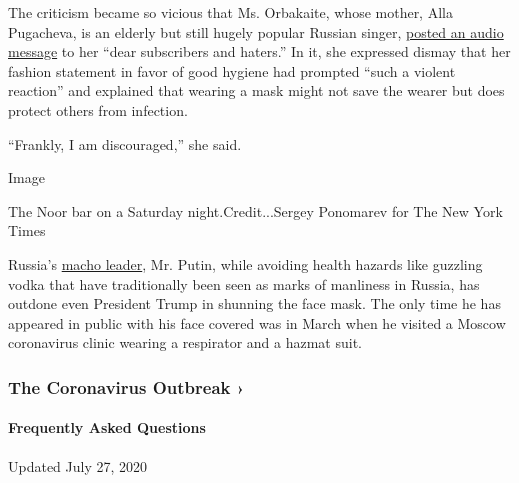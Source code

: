 The criticism became so vicious that Ms. Orbakaite, whose mother, Alla
Pugacheva, is an elderly but still hugely popular Russian singer,
\href{https://www.instagram.com/tv/CCHJPXkpV72/?utm_source=ig_embed}{posted
an audio message} to her ``dear subscribers and haters.'' In it, she
expressed dismay that her fashion statement in favor of good hygiene had
prompted ``such a violent reaction'' and explained that wearing a mask
might not save the wearer but does protect others from infection.

``Frankly, I am discouraged,'' she said.

Image

The Noor bar on a Saturday night.Credit...Sergey Ponomarev for The New
York Times

Russia's
\href{https://www.nytimes3xbfgragh.onion/2017/08/05/world/europe/vladimir-putin-russia-summer-vacation.html}{macho
leader}, Mr. Putin, while avoiding health hazards like guzzling vodka
that have traditionally been seen as marks of manliness in Russia, has
outdone even President Trump in shunning the face mask. The only time he
has appeared in public with his face covered was in March when he
visited a Moscow coronavirus clinic wearing a respirator and a hazmat
suit.

\href{https://www.nytimes3xbfgragh.onion/news-event/coronavirus?action=click\&pgtype=Article\&state=default\&region=MAIN_CONTENT_3\&context=storylines_faq}{}

\hypertarget{the-coronavirus-outbreak-}{%
\subsubsection{The Coronavirus Outbreak
›}\label{the-coronavirus-outbreak-}}

\hypertarget{frequently-asked-questions}{%
\paragraph{Frequently Asked
Questions}\label{frequently-asked-questions}}

Updated July 27, 2020

